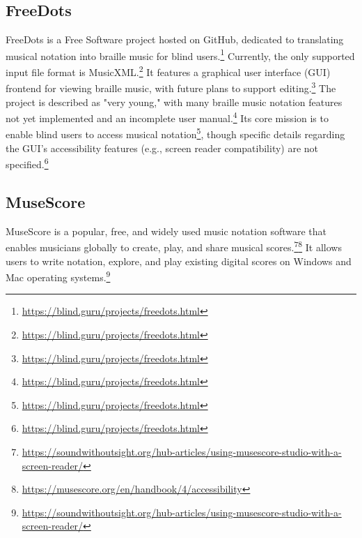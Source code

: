 \subsection{FreeDots}
FreeDots is a Free Software project hosted on GitHub, dedicated to translating musical notation into braille music for blind users.\footnote{\url{https://blind.guru/projects/freedots.html}} Currently, the only supported input file format is MusicXML.\footnote{\url{https://blind.guru/projects/freedots.html}} It features a graphical user interface (GUI) frontend for viewing braille music, with future plans to support editing.\footnote{\url{https://blind.guru/projects/freedots.html}} The project is described as "very young," with many braille music notation features not yet implemented and an incomplete user manual.\footnote{\url{https://blind.guru/projects/freedots.html}} Its core mission is to enable blind users to access musical notation\footnote{\url{https://blind.guru/projects/freedots.html}}, though specific details regarding the GUI's accessibility features (e.g., screen reader compatibility) are not specified.\footnote{\url{https://blind.guru/projects/freedots.html}}

\subsection{MuseScore}
MuseScore is a popular, free, and widely used music notation software that enables musicians globally to create, play, and share musical scores.\footnote{\url{https://soundwithoutsight.org/hub-articles/using-musescore-studio-with-a-screen-reader/}}\footnote{\url{https://musescore.org/en/handbook/4/accessibility}} It allows users to write notation, explore, and play existing digital scores on Windows and Mac operating systems.\footnote{\url{https://soundwithoutsight.org/hub-articles/using-musescore-studio-with-a-screen-reader/}}

